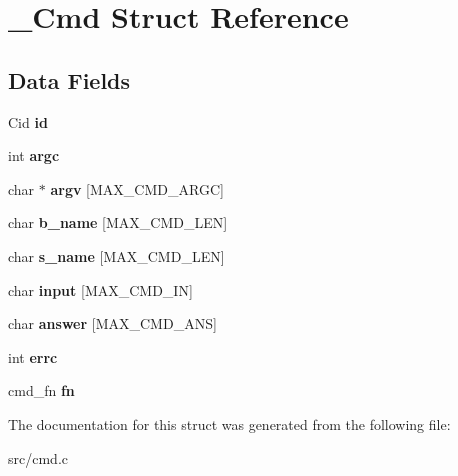 \hypertarget{struct__Cmd}{}\section{\+\_\+\+Cmd Struct Reference}
\label{struct__Cmd}
\subsection*{Data Fields}
\begin{DoxyCompactItemize}
\item 
\mbox{\label{struct__Cmd_a106b2045967078710623e3a5f401dde2}} 
Cid {\bfseries id}
\item 
\mbox{\label{struct__Cmd_af56ffa5c8c8f19251b15dc02a7eb352d}} 
int {\bfseries argc}
\item 
\mbox{\label{struct__Cmd_aaaa6f539ab5219743163ecb74138fe7a}} 
char $\ast$ {\bfseries argv} \mbox{[}M\+A\+X\+\_\+\+C\+M\+D\+\_\+\+A\+R\+GC\mbox{]}
\item 
\mbox{\label{struct__Cmd_adb97870a775bf9f9075d44420cb82439}} 
char {\bfseries b\+\_\+name} \mbox{[}M\+A\+X\+\_\+\+C\+M\+D\+\_\+\+L\+EN\mbox{]}
\item 
\mbox{\label{struct__Cmd_ac7a8c09e258cb2b2f63d179943616d08}} 
char {\bfseries s\+\_\+name} \mbox{[}M\+A\+X\+\_\+\+C\+M\+D\+\_\+\+L\+EN\mbox{]}
\item 
\mbox{\label{struct__Cmd_a3d023ded28ab2b9ec8daae3ebf1a3759}} 
char {\bfseries input} \mbox{[}M\+A\+X\+\_\+\+C\+M\+D\+\_\+\+IN\mbox{]}
\item 
\mbox{\label{struct__Cmd_a143c62700ed611e1ff0d70611c76fa55}} 
char {\bfseries answer} \mbox{[}M\+A\+X\+\_\+\+C\+M\+D\+\_\+\+A\+NS\mbox{]}
\item 
\mbox{\label{struct__Cmd_a4f3acf8cfdc67548121c1989765cbbcf}} 
int {\bfseries errc}
\item 
\mbox{\label{struct__Cmd_abfca5a0889206135702ed3e398079bad}} 
cmd\+\_\+fn {\bfseries fn}
\end{DoxyCompactItemize}


The documentation for this struct was generated from the following file\+:\begin{DoxyCompactItemize}
\item 
src/cmd.\+c\end{DoxyCompactItemize}
